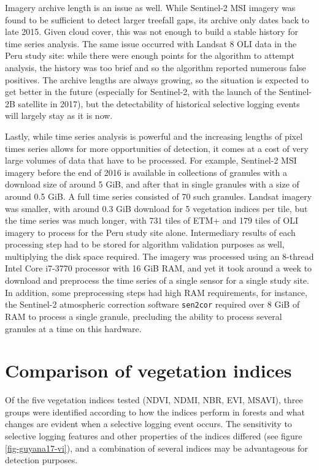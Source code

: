 \documentclass[a4paper,12pt]{scrbook}
\begin{document}
Imagery archive length is an issue as well. While Sentinel-2 \ac{MSI} imagery was found to be sufficient to detect larger treefall gaps, its archive only dates back to late 2015. Given cloud cover, this was not enough to build a stable history for time series analysis. The same issue occurred with Landsat 8 \ac{OLI} data in the Peru study site: while there were enough points for the algorithm to attempt analysis, the history was too brief and so the algorithm reported numerous false positives. The archive lengths are always growing, so the situation is expected to get better in the future (especially for Sentinel-2, with the launch of the Sentinel-2B satellite in 2017), but the detectability of historical selective logging events will largely stay as it is now.

Lastly, while time series analysis is powerful and the increasing lengths of pixel times series allows for more opportunities of detection, it comes at a cost of very large volumes of data that have to be processed. For example, Sentinel-2 \ac{MSI} imagery before the end of 2016 is available in collections of granules with a download size of around 5 \ac{GiB}, and after that in single granules with a size of around 0.5 \ac{GiB}. A full time series consisted of 70 such granules. Landsat imagery was smaller, with around 0.3 \ac{GiB} download for 5 vegetation indices per tile, but the time series was much longer, with 731 tiles of \ac{ETM+} and 179 tiles of \ac{OLI} imagery to process for the Peru study site alone. Intermediary results of each processing step had to be stored for algorithm validation purposes as well, multiplying the disk space required. The imagery was processed using an 8-thread Intel Core i7-3770 processor with 16 \ac{GiB} \ac{RAM}, and yet it took around a week to download and preprocess the time series of a single sensor for a single study site. In addition, some preprocessing steps had high \ac{RAM} requirements, for instance, the Sentinel-2 atmospheric correction software \texttt{sen2cor} required over 8 \ac{GiB} of \ac{RAM} to process a single granule, precluding the ability to process several granules at a time on this hardware.

\section{Comparison of vegetation indices}

Of the five vegetation indices tested (\ac{NDVI}, \ac{NDMI}, \ac{NBR}, \ac{EVI}, \ac{MSAVI}), three groups were identified according to how the indices perform in forests and what changes are evident when a selective logging event occurs. The sensitivity to selective logging features and other properties of the indices differed (see figure \ref{fig-guyana17-vi}), and a combination of several indices may be advantageous for detection purposes.
\end{document}
